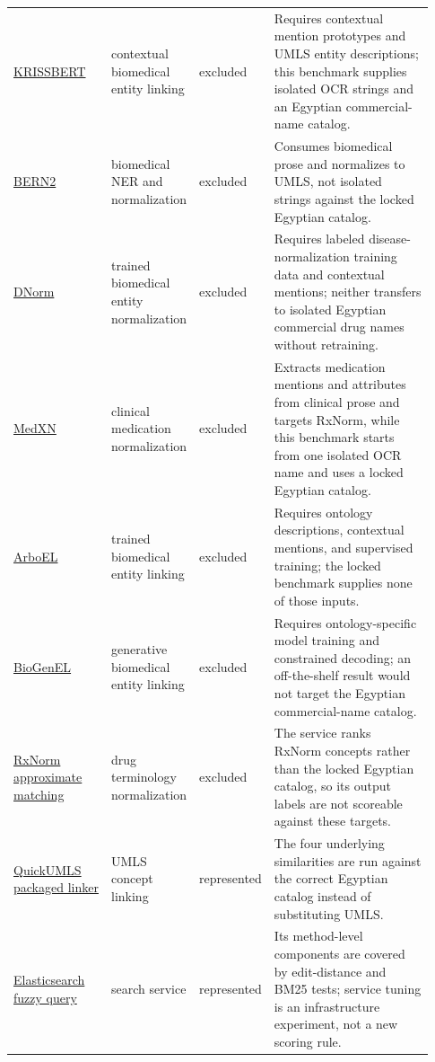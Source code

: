 \begin{landscape}
\begin{scriptsize}
\begin{longtable}{@{}L{0.24\linewidth}L{0.15\linewidth}L{0.12\linewidth}L{0.42\linewidth}@{}}
\href{https://github.com/microsoft/KRISS}{KRISSBERT} & contextual biomedical entity linking & excluded & Requires contextual mention prototypes and UMLS entity descriptions; this benchmark supplies isolated OCR strings and an Egyptian commercial-name catalog. \\
\href{https://github.com/dmis-lab/BERN2}{BERN2} & biomedical NER and normalization & excluded & Consumes biomedical prose and normalizes to UMLS, not isolated strings against the locked Egyptian catalog. \\
\href{https://www.ncbi.nlm.nih.gov/research/bionlp/Tools/dnorm/}{DNorm} & trained biomedical entity normalization & excluded & Requires labeled disease-normalization training data and contextual mentions; neither transfers to isolated Egyptian commercial drug names without retraining. \\
\href{https://github.com/clinicalnlplab/MedXN}{MedXN} & clinical medication normalization & excluded & Extracts medication mentions and attributes from clinical prose and targets RxNorm, while this benchmark starts from one isolated OCR name and uses a locked Egyptian catalog. \\
\href{https://github.com/davidkartchner/biomedical-entity-linking}{ArboEL} & trained biomedical entity linking & excluded & Requires ontology descriptions, contextual mentions, and supervised training; the locked benchmark supplies none of those inputs. \\
\href{https://github.com/davidkartchner/biomedical-entity-linking}{BioGenEL} & generative biomedical entity linking & excluded & Requires ontology-specific model training and constrained decoding; an off-the-shelf result would not target the Egyptian commercial-name catalog. \\
\href{https://lhncbc.nlm.nih.gov/RxNav/APIs/ApproxMatchAPIs.html}{RxNorm approximate matching} & drug terminology normalization & excluded & The service ranks RxNorm concepts rather than the locked Egyptian catalog, so its output labels are not scoreable against these targets. \\
\href{https://github.com/Georgetown-IR-Lab/QuickUMLS}{QuickUMLS packaged linker} & UMLS concept linking & represented & The four underlying similarities are run against the correct Egyptian catalog instead of substituting UMLS. \\
\href{https://github.com/elastic/elasticsearch}{Elasticsearch fuzzy query} & search service & represented & Its method-level components are covered by edit-distance and BM25 tests; service tuning is an infrastructure experiment, not a new scoring rule. \\

\end{longtable}
\end{scriptsize}
\end{landscape}
